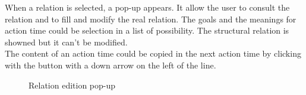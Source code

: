 When a relation is selected, a pop-up appears. It allow the user to consult the relation and to fill and modify the real relation. The goals and the meanings for action time could be selection in a list of possibility. The structural relation is showned but it can't be modified.\\

The content of an action time could be copied in the next action time by clicking with the button with a down arrow on the left of the line.\\

\begin{figure}[h!]
\centering
{}
\caption{Relation edition pop-up}
\label{edition_relation}
\end{figure}


